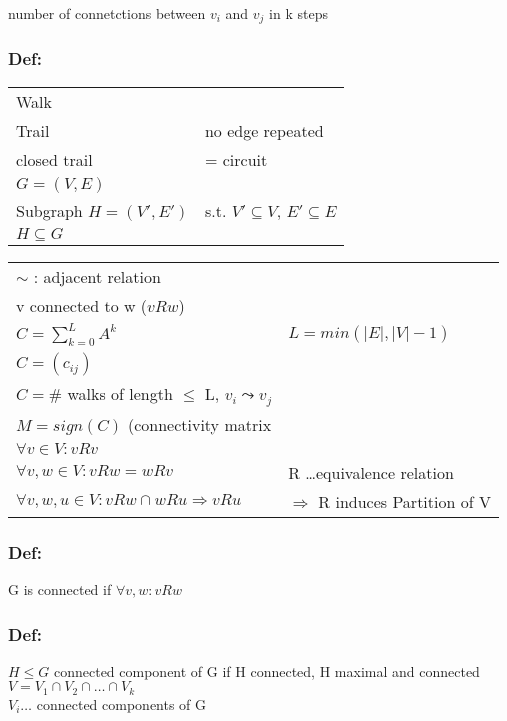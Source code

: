 number of connetctions between $v_i$ and $v_j$ in k steps

\subsubsection*{Def:}
\begin{tabular}{l l}
Walk \\

Trail	& no edge repeated \\

closed trail	& = circuit \\

$G=(V,E)$ \\
Subgraph $ H = (V',E')$	& s.t. $V' \subseteq V$, $E' \subseteq E$ \\
$H \subseteq G$ \\

\end{tabular}

\vspace{12pt}

\begin{tabular}{l l}
$\sim$ : adjacent relation \\

v connected to w ($vRw$) \\

$C = \sum_{k=0}^L A ^k$ 	& $ L = min(|E|, |V| -1)$ \\
$C=(c_{ij}) $ \\
$C = $\# walks of length $\leq$ L, $v_i \leadsto v_j$ \\

$M = sign(C)$ (connectivity matrix\\

$\forall v \in V: vRv$ \\
$\forall v,w \in V: vRw = wRv$ & R \ldots equivalence relation\\
$\forall v,w,u \in V: vRw \cap wRu \Rightarrow vRu$ & $ \Rightarrow$ R induces Partition of V \\

\end{tabular}


\subsubsection*{Def:}
G is connected if $\forall v,w: vRw$

\subsubsection*{Def:}
$ H \leq G$  connected component of G if H connected, H maximal and connected
$V = V_1 \cap V_2 \cap \ldots \cap V_k$ \\
$V_i \ldots $ connected components of G



